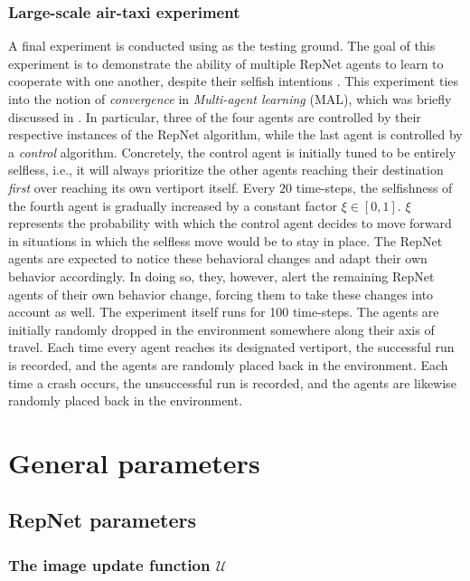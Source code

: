 \subsubsection{Large-scale air-taxi experiment}
A final experiment is conducted using  as the testing ground. The goal of this experiment is to demonstrate the ability of multiple RepNet agents to learn to cooperate with one another, despite their selfish intentions \cite{2590}. This experiment ties into the notion of \textit{convergence} in \textit{Multi-agent learning} (MAL), which was briefly discussed in . In particular, three of the four agents are controlled by their respective instances of the RepNet algorithm, while the last agent is controlled by a \textit{control} algorithm. Concretely, the control agent is initially tuned to be entirely selfless, i.e., it will always prioritize the other agents reaching their destination \textit{first} over reaching its own vertiport itself. Every $20$ time-steps, the selfishness of the fourth agent is gradually increased by a constant factor $\xi \in [0,1]$. $\xi$ represents the probability with which the control agent decides to move forward in situations in which the selfless move would be to stay in place. The RepNet agents are expected to notice these behavioral changes and adapt their own behavior accordingly. In doing so, they, however, alert the remaining RepNet agents of their own behavior change, forcing them to take these changes into account as well. 
The experiment itself runs for 100 time-steps. The agents are initially randomly dropped in the environment somewhere along their axis of travel. Each time every agent reaches its designated vertiport, the successful run is recorded, and the agents are randomly placed back in the environment. Each time a crash occurs, the unsuccessful run is recorded, and the agents are likewise randomly placed back in the environment. 


\label{sub:largescale}
\section{General parameters}
\label{sec:params}

\subsection{RepNet parameters}

\subsubsection{The image update function $\mathcal{U}$}
\label{sub:updatenn}


